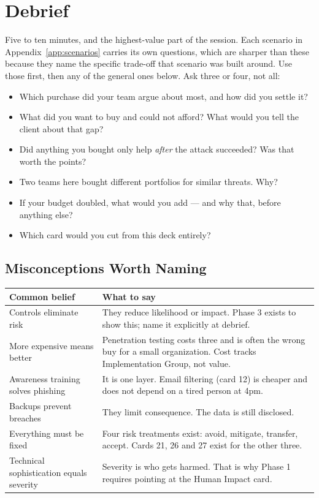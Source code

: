 \documentclass[11pt,letterpaper]{article}
\begin{document}
\section{Debrief}

Five to ten minutes, and the highest-value part of the session. Each scenario in
Appendix~\ref{app:scenarios} carries its own questions, which are sharper than
these because they name the specific trade-off that scenario was built around.
Use those first, then any of the general ones below. Ask three or four, not all:

\begin{itemize}
\item Which purchase did your team argue about most, and how did you settle it?
\item What did you want to buy and could not afford? What would you tell the
client about that gap?
\item Did anything you bought only help \emph{after} the attack succeeded? Was
that worth the points?
\item Two teams here bought different portfolios for similar threats. Why?
\item If your budget doubled, what would you add --- and why that, before
anything else?
\item Which card would you cut from this deck entirely?
\end{itemize}

\subsection{Misconceptions Worth Naming}

\begin{center}
\small
\begin{tabularx}{\textwidth}{@{}p{5.4cm} X@{}}
\toprule
\textbf{Common belief} & \textbf{What to say} \\
\midrule
Controls eliminate risk & They reduce likelihood or impact. Phase 3 exists to
show this; name it explicitly at debrief. \\
More expensive means better & Penetration testing costs three and is often the
wrong buy for a small organization. Cost tracks Implementation Group, not value. \\
Awareness training solves phishing & It is one layer. Email filtering (card 12)
is cheaper and does not depend on a tired person at 4pm. \\
Backups prevent breaches & They limit consequence. The data is still disclosed. \\
Everything must be fixed & Four risk treatments exist: avoid, mitigate,
transfer, accept. Cards 21, 26 and 27 exist for the other three. \\
Technical sophistication equals severity & Severity is who gets harmed. That is
why Phase 1 requires pointing at the Human Impact card. \\
\bottomrule
\end{tabularx}
\end{center}
\end{document}
